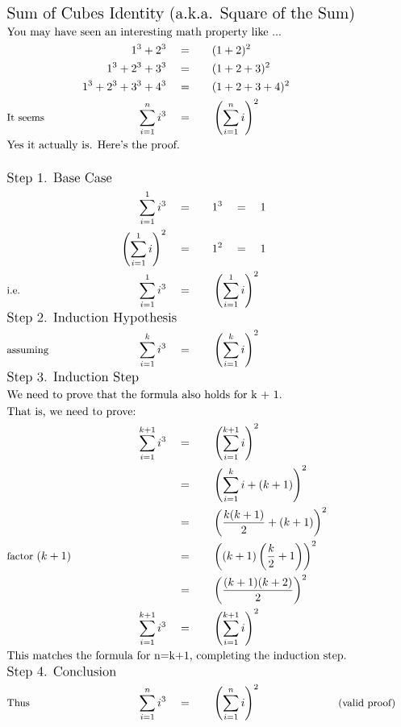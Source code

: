 \begin{alignat*}{5}
&\rlap{\Large\text{Sum of Cubes Identity (a.k.a. Square of the Sum)}}\\
&\rlap{\text{You may have seen an interesting math property like ...}}\\
&\,&1^3+2^3\quad&=\quad&&(1+2)^2\\
&\,&1^3+2^3+3^3\quad&=\quad&&(1+2+3)^2\\
&\,&1^3+2^3+3^3+4^3\quad&=\quad&&(1+2+3+4)^2\\
&\small\text{It seems}&\sum_{i=1}^{n}i^3\quad&=&&\left(\sum_{i=1}^{n}i\right)^2\\
&\rlap{\text{Yes it actually is. Here's the proof.}}\\ \\
&\rlap{\large\text{Step 1. Base Case}}\\
&\,&\sum_{i=1}^{1}i^3\quad&=&&1^3\quad=\quad1\\
&\,&\left(\sum_{i=1}^{1}i\right)^2\quad&=&&1^2\quad=\quad1\\
&\small\text{i.e.}&\sum_{i=1}^{1}i^3\quad&=&&\left(\sum_{i=1}^{1}i\right)^2\\
&\rlap{\large\text{Step 2. Induction Hypothesis}}\\
&\small\text{assuming}\qquad&\sum_{i=1}^{k}i^3\quad&=&&\left(\sum_{i=1}^{k}i\right)^2\\
&\rlap{\large\text{Step 3. Induction Step}}\\
&\rlap{\text{We need to prove that the formula also holds for k + 1.}}\\
&\rlap{\text{That is, we need to prove:}}\\
&\,&\sum_{i=1}^{k+1}i^3\quad&=&&\left(\sum_{i=1}^{k+1}i\right)^2\\
&\,&\,&=&&\left(\sum_{i=1}^{k}i+(k+1)\right)^2\\
&\,&\,&=&&\left(\frac{k(k+1)}{2}+(k+1)\right)^2\\
&\small\text{factor }(k+1)&\,&=&&\left((k+1)\left(\frac{k}{2}+1\right)\right)^2\\
&\,&\,&=&&\left(\frac{(k+1)(k+2)}{2}\right)^2\\
&\,&\sum_{i=1}^{k+1}i^3\quad&=&&\left(\sum_{i=1}^{k+1}i\right)^2\\
&\rlap{\text{This matches the formula for }n=k+1\text{, completing the induction step.}}\\
&\rlap{\large\text{Step 4. Conclusion}}\\
&\small\text{Thus}&\sum_{i=1}^{n}i^3\quad&=&&\left(\sum_{i=1}^{n}i\right)^2\qquad&&\small\text{(valid proof)}\\
\end{alignat*}
